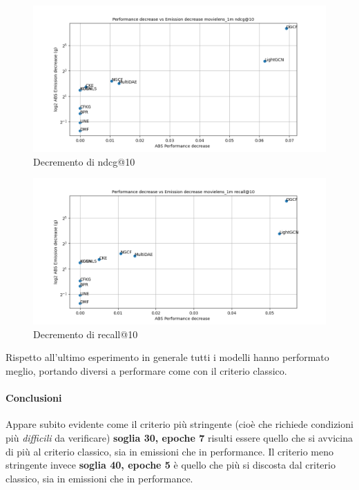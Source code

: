 \begin{figure}[H]
    \centering
     \includegraphics[width=\textwidth]{images/decrement_ndcg@10_movielens_1m_30_7.png}
    \caption{Decremento di ndcg@10}
\end{figure}

\begin{figure}[H]
    \centering
     \includegraphics[width=\textwidth]{images/decrement_recall@10_movielens_1m_30_7.png}
    \caption{Decremento di recall@10}
\end{figure}

\noindent Rispetto all'ultimo esperimento in generale tutti i modelli hanno performato meglio, portando diversi a performare come con il criterio classico.

\paragraph{Conclusioni}

Appare subito evidente come il criterio più stringente (cioè che richiede condizioni più \textit{difficili} da verificare) \textbf{soglia 30, epoche 7} risulti essere quello che si avvicina di più al criterio classico, sia in emissioni che in performance. Il criterio meno stringente invece \textbf{soglia 40, epoche 5} è quello che più si discosta dal criterio classico, sia in emissioni che in performance.\\


